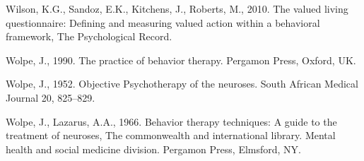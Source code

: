 \documentclass[3p]{elsarticle} %
\newlength{\cslhangindent}
\newlength{\cslentryspacingunit} %
\newenvironment{CSLReferences}[2] %
 {%
  \setlength{\parindent}{0pt}
  \ifodd #1
  \let\oldpar\par
  \def\par{\hangindent=\cslhangindent\oldpar}
  \fi
  \setlength{\parskip}{#2\cslentryspacingunit}
 }%
 {}
\begin{document}
\begin{CSLReferences}{1}{0}
\leavevmode{}%
Wilson, K.G., Sandoz, E.K., Kitchens, J., Roberts, M., 2010. The valued
living questionnaire: Defining and measuring valued action within a
behavioral framework, The Psychological Record.

\leavevmode{}%
Wolpe, J., 1990. {The practice of behavior therapy}. Pergamon Press,
Oxford, UK.

\leavevmode{}%
Wolpe, J., 1952. {Objective Psychotherapy of the neuroses}. South
African Medical Journal 20, 825--829.

\leavevmode{}%
Wolpe, J., Lazarus, A.A., 1966. {Behavior therapy techniques: A guide to
the treatment of neuroses}, The commonwealth and international library.
Mental health and social medicine division. Pergamon Press, Elmsford,
NY.

\end{CSLReferences}
\end{document}
